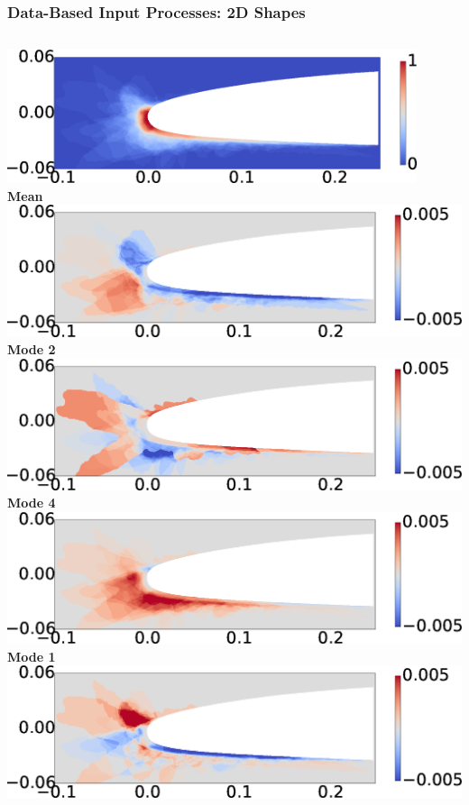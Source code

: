 \documentclass[9pt]{beamer}
\begin{document}
\begin{frame}
\frametitle{Data-Based Input Processes: 2D Shapes}
\label{sec-3-6}


\begin{columns}[c]
    \centering
    \hspace{-2.17em}
    \includegraphics[width=0.9\textwidth]{MEAN.png} \\
    {\bf Mean} \\
    \includegraphics[width=1\textwidth]{MODE2.png} \\
    {\bf Mode 2} \\
    \includegraphics[width=1\textwidth]{MODE4.png} \\
    {\bf Mode 4}
    \centering
    \includegraphics[width=1\textwidth]{MODE1.png} \\
    {\bf Mode 1} \\
    \includegraphics[width=1\textwidth]{MODE3.png} \\

\end{columns}
\end{frame}
\end{document}
